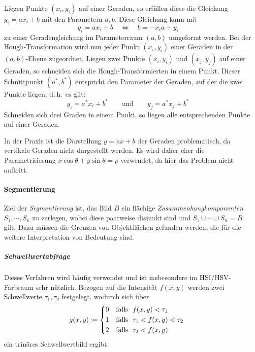 \documentclass[a4paper, 11pt, accentcolor = tud3b]{tudreport}
\renewcommand{\dh}{d.\,h.~}
\begin{document}
							Liegen Punkte \( (x_i, y_i) \) auf einer Geraden, so erfüllen diese die Gleichung \( y_i = ax_i + b \) mit den Parametern \(a, b\). Diese Gleichung kann mit
							\begin{equation*}
								y_i = ax_i + b \quad\iff\quad b = -x_ia + y_i
							\end{equation*}
							zu einer Geradengleichung im Parameterraum \( (a, b) \) umgeformt werden. Bei der Hough-Transformation wird nun jeder Punkt \( (x_i, y_i) \) einer Geraden in der \( (a, b) \)-Ebene zugeordnet. Liegen zwei Punkte \( (x_i, y_i) \) und \( (x_j, y_j) \) auf einer Geraden, so schneiden sich die Hough-Transformierten in einem Punkt. Dieser Schnittpunkt \( (a^\ast, b^\ast) \) entspricht den Parameter der Geraden, auf der die zwei Punkte liegen, \dh es gilt:
							\begin{equation*}
								y_i = a^\ast x_i + b^\ast \quad\quad\text{und}\quad\quad y_j = a^\ast x_j + b^\ast
							\end{equation*}
							Schneiden sich drei Graden in einem Punkt, so liegen alle entsprechenden Punkte auf einer Geraden.
							
							In der Praxis ist die Darstellung \( y = ax + b \) der Geraden problematisch, da vertikale Geraden nicht dargestellt werden. Es wird daher eher die Parametrisierung \( x \cos\theta + y \sin\theta = \rho \) verwendet, da hier das Problem nicht auftritt.
							

					\paragraph{Segmentierung}
						Ziel der \emph{Segmentierung} ist, das Bild \(B\) ein flächige \emph{Zusammenhangkomponenten} \( S_1, \cdots, S_n \) zu zerlegen, wobei diese paarweise disjunkt sind und \( S_1 \cup \cdots \cup S_n = B \) gilt. Dazu müssen die Grenzen von Objektflächen gefunden werden, die für die weitere Interpretation von Bedeutung sind.

						\subparagraph{Schwellwertabfrage}
							Dieses Verfahren wird häufig verwendet und ist insbesondere im HSI/HSV-Farbraum sehr nützlich. Bezogen auf die Intensität \( f(x, y) \) werden zwei Schwellwerte \( \tau_1, \tau_2 \) festgelegt, wodurch sich über
							\begin{equation*}
								g(x, y) \coloneqq
									\begin{cases*}
										0 & \text{falls } \( f(x, y) < \tau_1 \) \\
										1 & \text{falls } \( \tau_1 < f(x, y) < \tau_2 \) \\
										2 & \text{falls } \( \tau_2 < f(x, y) \)
									\end{cases*}
							\end{equation*}
							ein trinäres Schwellwertbild ergibt.
							
\end{document}
